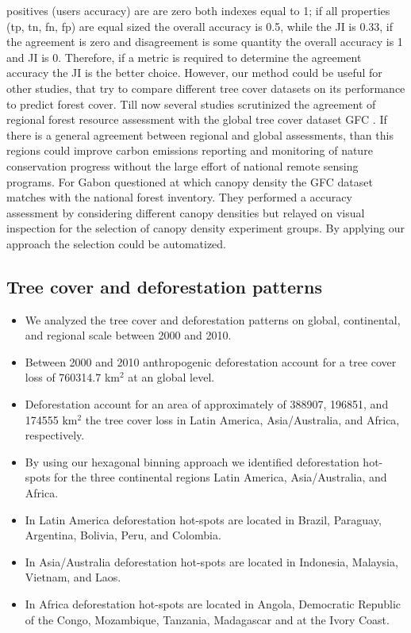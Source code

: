positives (users accuracy) are are zero both indexes equal to 1; if all properties (tp, tn, fn, fp) are equal sized the overall accuracy is 0.5, while the \ac{JI} is 0.33, if the agreement is zero and disagreement is some quantity the overall accuracy is 1 and \ac{JI} is 0. Therefore, if a metric is required to determine the agreement accuracy the \ac{JI} is the better choice. However, our method could be useful for other studies, that try to compare different tree cover datasets on its performance to predict forest cover. Till now several studies scrutinized the agreement of regional forest resource assessment with the global tree cover dataset \ac{GFC} \citep{Sannier2016,McRoberts2016,Gross2017}. If there is a general agreement between regional and global assessments, than this regions could improve carbon emissions reporting and monitoring of nature conservation progress without the large effort of national remote sensing programs. For Gabon \citeauthor{Sannier2016} questioned at which canopy density the \ac{GFC} dataset matches with the national forest inventory. They performed a accuracy assessment by considering different canopy densities but relayed on visual inspection for the selection of canopy density experiment groups. By applying our approach the selection could be automatized.

		\subsection{Tree cover and deforestation patterns}
		\label{subsec:discussion_tree_cover_and_deforestation}
			\begin{itemize}
				\item We analyzed the tree cover and deforestation patterns on global, continental, and regional scale between 2000 and 2010.
				\item Between 2000 and 2010 anthropogenic deforestation account for a tree cover loss of 760314.7 km$^2$ at an global level.
				\item Deforestation account for an area of approximately of 388907, 196851, and 174555 km$^2$ the tree cover loss in Latin America, Asia/Australia, and Africa, respectively.
				\item By using our hexagonal binning approach we identified deforestation hot-spots for the three continental regions Latin America, Asia/Australia, and Africa.
				\item In Latin America deforestation hot-spots are located in Brazil, Paraguay, Argentina, Bolivia, Peru, and Colombia.
				\item In Asia/Australia deforestation hot-spots are located in Indonesia, Malaysia, Vietnam, and Laos.
				\item In Africa deforestation hot-spots are located in Angola, Democratic Republic of the Congo, Mozambique, Tanzania, Madagascar and at the Ivory Coast.
			\end{itemize}

